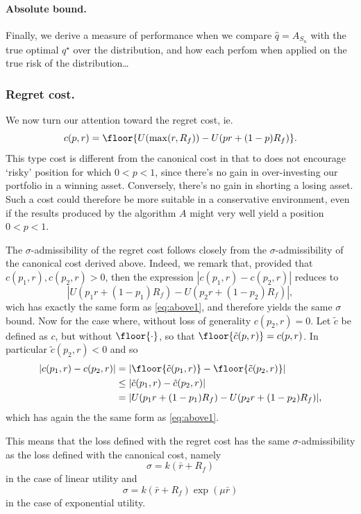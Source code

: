 \paragraph{Absolute bound.}
Finally, we derive a measure of performance when we compare $\hat q=A_{S_n}$ with the true
optimal $q^\star$ over the distribution, and how each perfom when applied on the true risk
of the distribution\ldots

\subsubsection{Regret cost.}

We now turn our attention toward the regret cost, ie.
\begin{equation*}
  c(p,r) = \floor{U(\max(r,R_f)) - U(pr + (1-p)R_f)}.
\end{equation*}
This type cost is different from the canonical cost in that to does not encourage `risky'
position for which $0<p<1$, since there's no gain in over-investing our portfolio in a
winning asset. Conversely, there's no gain in shorting a losing asset. Such a cost could
therefore be more suitable in a conservative environment, even if the results produced by
the algorithm $A$ might very well yield a position $0<p<1$.

\begin{rem}
  The $\sigma$-admissibility of the regret cost follows closely from the
  $\sigma$-admissibility of the canonical cost derived above. Indeed, we remark that,
  provided that $c(p_1,r), c(p_2,r) > 0$, then the expression $|c(p_1,r) - c(p_2,r)|$
  reduces to 
  \begin{equation*}
    |U(p_1r + (1-p_1)R_f) - U(p_2r + (1-p_2)R_f)|,
  \end{equation*}
  wich has exactly the same form as \eqref{eq:above1}, and therefore yields the same
  $\sigma$ bound. Now for the case where, without loss of generality $c(p_2,r) = 0$. Let
  $\tilde c$ be defined as $c$, but without $\floor{\cdot}$, so that
  $\floor{\tilde{c}(p,r)} = c(p,r)$. In particular $\tilde c(p_2,r)<0$ and so
  \begin{align*}
    |c(p_1,r) - c(p_2,r)| &= |\floor{\tilde c(p_1,r)} - \floor{\tilde c(p_2,r)}|\\
    &\leq |\tilde c(p_1,r) - \tilde c(p_2,r)|\\
    &= |U(p_1r + (1-p_1)R_f) - U(p_2r + (1-p_2)R_f)|,
  \end{align*}
  which has again the the same form as \eqref{eq:above1}.

  This means that the loss defined with the regret cost has the same
  $\sigma$-admissibility as the loss defined with the canonical cost, namely 
  \begin{equation*}
    \sigma = k(\bar r + R_f)
  \end{equation*}
  in the case of linear utility and 
  \begin{equation*}
    \sigma = k(\bar r+R_f) \exp(\mu\bar r)
  \end{equation*}
  in the case of exponential utility. 
\end{rem}

